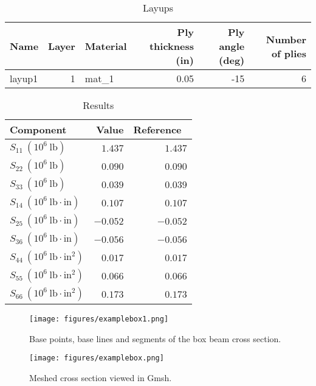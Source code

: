 \documentclass{book}
\begin{document}
\begin{table}[h]
  \centering
  \caption{Layups}
  \begin{tabular}{lrlrrr}
    \toprule
    Name & Layer & Material & Ply thickness (in) & Ply angle (deg) & Number of plies \\
    \midrule
    layup1 & 1 & mat\_1 & 0.05 & -15 & 6 \\
    \bottomrule
  \end{tabular}
  \label{table:box_layups}
\end{table}

\begin{table}[h]
  \centering
  \caption{Results}
  \begin{tabular}{lrr}
    \toprule
    Component & Value & Reference~\cite{yu2012} \\
    \midrule
    $S_{11}\ (10^6\ \mathrm{lb})$ & $1.437$ & $1.437$ \\
    $S_{22}\ (10^6\ \mathrm{lb})$ & $0.090$ & $0.090$ \\
    $S_{33}\ (10^6\ \mathrm{lb})$ & $0.039$ & $0.039$ \\
    $S_{14}\ (10^6\ \mathrm{lb \cdot in})$ & $0.107$ & $0.107$ \\
    $S_{25}\ (10^6\ \mathrm{lb \cdot in})$ & $-0.052$ & $-0.052$ \\
    $S_{36}\ (10^6\ \mathrm{lb \cdot in})$ & $-0.056$ & $-0.056$ \\
    $S_{44}\ (10^6\ \mathrm{lb \cdot in^2})$ & $0.017$ & $0.017$ \\
    $S_{55}\ (10^6\ \mathrm{lb \cdot in^2})$ & $0.066$ & $0.066$ \\
    $S_{66}\ (10^6\ \mathrm{lb \cdot in^2})$ & $0.173$ & $0.173$ \\
    \bottomrule
  \end{tabular}
  \label{table:box_results}
\end{table}

\begin{figure}[h]
  \centerline{\texttt{[image: figures/examplebox1.png]}}
  \caption{Base points, base lines and segments of the box beam cross section.}
  \label{fig:box_1}
\end{figure}

\begin{figure}[h]
  \centerline{\texttt{[image: figures/examplebox.png]}}
  \caption{Meshed cross section viewed in Gmsh.}
  \label{fig:box}
\end{figure}
\end{document}
